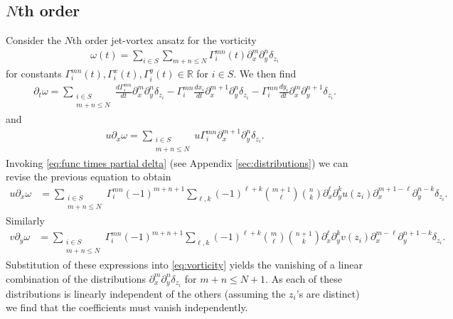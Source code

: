 \documentclass[12pt]{amsart}
\newcommand{\R}{\ensuremath{\mathbb{R}}}
\theoremstyle{remark}
\begin{document}
\subsection{$N$th order}
Consider the $N$th order jet-vortex ansatz for the vorticity
\begin{align}
  \omega(t) = \sum_{i \in S} \sum_{m+n \leq N} \Gamma^{mn}_i(t) \partial_x^m \partial_y^n \delta_{z_i} \label{eq:ansatz N}
\end{align}
for constants $\Gamma^{mn}_i(t),\Gamma_i^x(t),\Gamma_i^y(t) \in \R$ for $i \in S$.
We then find
\begin{align*}
  \partial_t \omega =	
  \sum_{
  	\substack{
		i \in S \\
		m+n \leq N}}
  	\frac{d \Gamma_i^{mn}}{dt} \partial_x^m \partial_y^n \delta_{z_i} - \Gamma_i^{mn} \frac{dx_i}{dt} \partial_{x}^{m+1} \partial_y^{n} \delta_{z_i}
	- \Gamma_i^{mn} \frac{dy_i}{dt} \partial_{x}^{m} \partial_y^{n+1} \delta_{z_i}.
\end{align*}
and
\begin{align*}
  u \partial_x \omega = 
  \sum_{
  	\substack{
		i \in S \\
		m+n \leq N}}
   u \Gamma_i ^{mn}\partial_x^{m+1} \partial_y^n \delta_{z_i}.
\end{align*}
Invoking \eqref{eq:func times partial delta} (see Appendix
\ref{sec:distributions}) we can revise the previous equation to
obtain
\begin{align*}
  u \partial_x \omega &=
  \sum_{
  	\substack{
		i \in S \\
		m+n \leq N}}
	\Gamma_i^{mn} (-1)^{m+n+1} \sum_{\ell,k} (-1)^{\ell + k} \binom{m+1}{\ell} \binom{n}{k} \partial_x^{\ell} \partial_y^k u(z_i) \partial_x^{m+1-\ell} \partial_y^{n-k} \delta_{z_i}.
\end{align*}
Similarly
\begin{align*}
  v \partial_y \omega &=
  \sum_{
  	\substack{
		i \in S \\
		m+n \leq N}}
	\Gamma_i^{mn} (-1)^{m+n+1} \sum_{\ell,k} (-1)^{\ell + k} \binom{m}{\ell} \binom{n+1}{k} \partial_x^{\ell} \partial_y^k v(z_i) \partial_x^{m-\ell} \partial_y^{n+1-k} \delta_{z_i}.
\end{align*}
Substitution of these expressions into \eqref{eq:vorticity} yields
the vanishing of a linear combination of the distributions
$\partial_x^m \partial_y^n \delta_{z_i}$
for $m+n \leq N+1$.
As each of these distributions is linearly independent
of the others (assuming the $z_i$'s are distinct)
we find that the coefficients must vanish independently.
\end{document}
